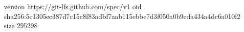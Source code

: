 version https://git-lfs.github.com/spec/v1
oid sha256:5c1305ec387d7c15c8f83adbf7aab115ebbe7d3f050a0b9eda434a4dc6a010f2
size 295298
